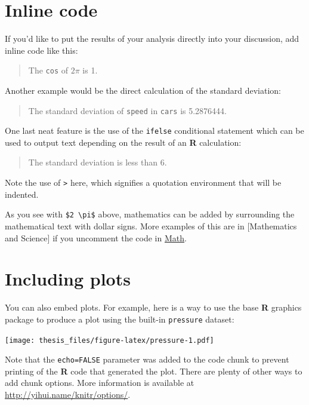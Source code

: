 \documentclass[12pt,twoside]{reedthesis}
\theoremstyle{definition}
\theoremstyle{definition}
\theoremstyle{remark}
\begin{document}
  \section{Inline code}\label{inline-code}
  
  If you'd like to put the results of your analysis directly into your
  discussion, add inline code like this:
  
  \begin{quote}
  The \texttt{cos} of \(2 \pi\) is 1.
  \end{quote}
  
  Another example would be the direct calculation of the standard
  deviation:
  
  \begin{quote}
  The standard deviation of \texttt{speed} in \texttt{cars} is 5.2876444.
  \end{quote}
  
  One last neat feature is the use of the \texttt{ifelse} conditional
  statement which can be used to output text depending on the result of an
  \textbf{R} calculation:
  
  \begin{quote}
  The standard deviation is less than 6.
  \end{quote}
  
  Note the use of \texttt{\textgreater{}} here, which signifies a
  quotation environment that will be indented.
  
  As you see with \texttt{\$2\ \textbackslash{}pi\$} above, mathematics
  can be added by surrounding the mathematical text with dollar signs.
  More examples of this are in {[}Mathematics and Science{]} if you
  uncomment the code in \protect\hyperlink{math}{Math}.
  
  \section{Including plots}\label{including-plots}
  
  You can also embed plots. For example, here is a way to use the base
  \textbf{R} graphics package to produce a plot using the built-in
  \texttt{pressure} dataset:
  
  \texttt{[image: thesis\_files/figure-latex/pressure-1.pdf]}
  
  Note that the \texttt{echo=FALSE} parameter was added to the code chunk
  to prevent printing of the \textbf{R} code that generated the plot.
  There are plenty of other ways to add chunk options. More information is
  available at \url{http://yihui.name/knitr/options/}.
  
\end{document}
